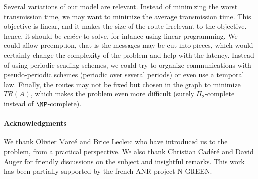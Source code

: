 \documentclass[a4paper,10pt]{article}
\begin{document}
   	Several variations of our model are relevant. Instead of minimizing the worst transmission time, we may want to minimize the average transmission time. This objective is linear, and it makes the size of the route irrelevant to the objective. hence, it should be \emph{easier} to solve, for intance using linear programming. We could allow preemption, that is the messages may be cut into pieces, which would certainly change the complexity of the problem and help with the latency.  Instead of using periodic sending schemes, we could try to organize communications with pseudo-periodic schemes (periodic over several periods) or even use a temporal law.  Finally, the routes may not be fixed but chosen in the graph to minimize $TR(A)$, which makes the problem even more difficult (surely $\Pi_2$-complete instead of $\NP$-complete). 



 	\paragraph*{Acknowledgments} 
 	We thank Olivier Marcé and Brice Leclerc who have introduced us to the problem, from a practical perspective. We also thank Christian Cad\'er\'e and David Auger for friendly discussions on the subject and insightful remarks. This work has been partially supported by the french ANR project N-GREEN.



\end{document}
